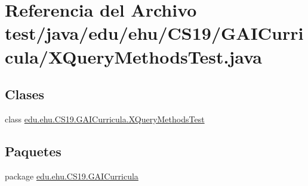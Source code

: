 \hypertarget{a00011}{}\section{Referencia del Archivo test/java/edu/ehu/\+C\+S19/\+G\+A\+I\+Curricula/\+X\+Query\+Methods\+Test.java}
\label{a00011}
\subsection*{Clases}
\begin{DoxyCompactItemize}
\item 
class \mbox{\hyperlink{a00036}{edu.\+ehu.\+C\+S19.\+G\+A\+I\+Curricula.\+X\+Query\+Methods\+Test}}
\end{DoxyCompactItemize}
\subsection*{Paquetes}
\begin{DoxyCompactItemize}
\item 
package \mbox{\hyperlink{a00017}{edu.\+ehu.\+C\+S19.\+G\+A\+I\+Curricula}}
\end{DoxyCompactItemize}
